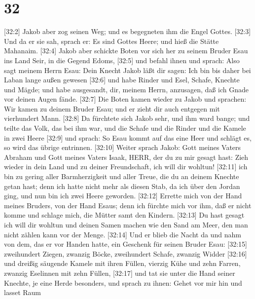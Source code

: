 \hypertarget{section-31}{%
\section{32}\label{section-31}}

 {[}32:2{]} Jakob aber zog seinen Weg; und es begegneten ihm
die Engel Gottes.  {[}32:3{]} Und da er sie sah, sprach er:
Es sind Gottes Heere; und hieß die Stätte Mahanaim. 
{[}32:4{]} Jakob aber schickte Boten vor sich her zu seinem Bruder Esau
ins Land Seir, in die Gegend Edoms,  {[}32:5{]} und befahl
ihnen und sprach: Also sagt meinem Herrn Esau: Dein Knecht Jakob läßt
dir sagen: Ich bin bis daher bei Laban lange außen gewesen 
{[}32:6{]} und habe Rinder und Esel, Schafe, Knechte und Mägde; und habe
ausgesandt, dir, meinem Herrn, anzusagen, daß ich Gnade vor deinen Augen
fände.  {[}32:7{]} Die Boten kamen wieder zu Jakob und
sprachen: Wir kamen zu deinem Bruder Esau; und er zieht dir auch
entgegen mit vierhundert Mann.  {[}32:8{]} Da fürchtete sich
Jakob sehr, und ihm ward bange; und teilte das Volk, das bei ihm war,
und die Schafe und die Rinder und die Kamele in zwei Heere 
{[}32:9{]} und sprach: So Esau kommt auf das eine Heer und schlägt es,
so wird das übrige entrinnen.  {[}32:10{]} Weiter sprach
Jakob: Gott meines Vaters Abraham und Gott meines Vaters Isaak, HERR,
der du zu mir gesagt hast: Zieh wieder in dein Land und zu deiner
Freundschaft, ich will dir wohltun!  {[}32:11{]} ich bin zu
gering aller Barmherzigkeit und aller Treue, die du an deinem Knechte
getan hast; denn ich hatte nicht mehr als diesen Stab, da ich über den
Jordan ging, und nun bin ich zwei Heere geworden. 
{[}32:12{]} Errette mich von der Hand meines Bruders, von der Hand
Esaus; denn ich fürchte mich vor ihm, daß er nicht komme und schlage
mich, die Mütter samt den Kindern.  {[}32:13{]} Du hast
gesagt ich will dir wohltun und deinen Samen machen wie den Sand am
Meer, den man nicht zählen kann vor der Menge.  {[}32:14{]}
Und er blieb die Nacht da und nahm von dem, das er vor Handen hatte, ein
Geschenk für seinen Bruder Esau:  {[}32:15{]} zweihundert
Ziegen, zwanzig Böcke, zweihundert Schafe, zwanzig Widder 
{[}32:16{]} und dreißig säugende Kamele mit ihren Füllen, vierzig Kühe
und zehn Farren, zwanzig Eselinnen mit zehn Füllen, 
{[}32:17{]} und tat sie unter die Hand seiner Knechte, je eine Herde
besonders, und sprach zu ihnen: Gehet vor mir hin und lasset Raum
